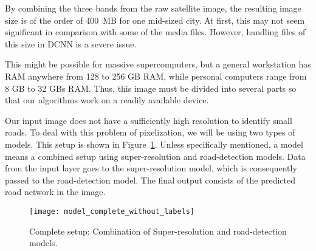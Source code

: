 By combining the three bands from the raw satellite image, the resulting image size is of the order of 400~MB for one mid-sized city. At first, this may not seem significant in comparison with some of the media files. However, handling files of this size in DCNN is a severe issue. 

This might be possible for massive supercomputers, but a general workstation has RAM anywhere from 128 to 256 GB RAM, while personal computers range from 8 GB to 32 GBs RAM. Thus, this image must be divided into several parts so that our algorithms work on a readily available device.

Our input image does not have a sufficiently high resolution to identify small roads. To deal with this problem of pixelization, we will be using two types of models. This setup is shown in Figure~\ref{fig:model_complete_without_labels}. Unless specifically mentioned, a model means a combined setup using super-resolution and road-detection models. Data from the input layer goes to the super-resolution model, which is consequently passed to the road-detection model. The final output consists of the predicted road network in the image.

\begin{figure}
  \centering
  \texttt{[image: model\_complete\_without\_labels]}
  \caption{Complete setup: Combination of Super-resolution and road-detection models.}
  \label{fig:model_complete_without_labels}
\end{figure}
